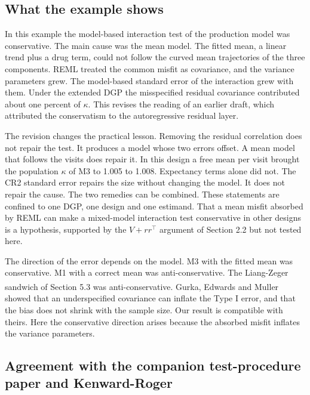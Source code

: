 \documentclass[
  11pt,
]{article}
\begin{document}
\subsection{What the example shows}\label{what-the-example-shows}

In this example the model-based interaction test of the production
model was conservative. The main cause was the mean model. The fitted
mean, a linear trend plus a drug term, could not follow the curved
mean trajectories of the three components. REML treated the common
misfit as covariance, and the variance parameters grew. The
model-based standard error of the interaction grew with them. Under
the extended DGP the misspecified residual covariance contributed
about one percent of \(\kappa\). This revises the reading of an earlier
draft, which attributed the conservatism to the autoregressive
residual layer.

The revision changes the practical lesson. Removing the residual
correlation does not repair the test. It produces a model whose two
errors offset. A mean model that follows the visits does repair it.
In this design a free mean per visit brought the population \(\kappa\)
of M3 to 1.005 to 1.008. Expectancy terms alone did not.
The CR2 standard error repairs the size without changing the model.
It does not repair the cause. The two remedies can be combined. These
statements are confined to one DGP, one design and one estimand. That
a mean misfit absorbed by REML can make a mixed-model interaction test
conservative in other designs is a hypothesis, supported by the
\(V + rr^\top\) argument of Section 2.2 but not tested here.

The direction of the error depends on the model. M3 with the fitted
mean was conservative. M1 with a correct mean was anti-conservative. The Liang-Zeger
sandwich of Section 5.3 was anti-conservative. Gurka, Edwards and Muller\textsuperscript{} showed that
an underspecified covariance can inflate the Type I error, and that
the bias does not shrink with the sample size. Our result is
compatible with theirs. Here the conservative direction arises
because the absorbed misfit inflates the variance parameters.

\subsection{Agreement with the companion test-procedure paper and Kenward-Roger}\label{agreement-with-the-companion-test-procedure-paper-and-kenward-roger}
\end{document}
